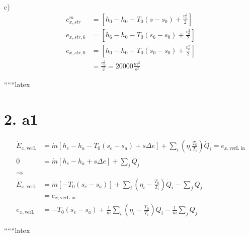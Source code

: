 c)
\begin{align*}
    e_{x,str}^m &= \left[ h_0 - h_0 - T_0 (s - s_0) + \frac{v_0^2}{2} \right] \\
    e_{x,str,6} &= \left[ h_6 - h_0 - T_0 (s_6 - s_0) + \frac{v_6^2}{2} \right] \\
    e_{x,str,0} &= \left[ h_0 - h_0 - T_0 (s_0 - s_0) + \frac{v_0^2}{2} \right] \\
    &= \frac{v_0^2}{2} = 20000 \frac{m^2}{s^2}
\end{align*}

``````latex

\section*{2. a1}

\begin{align*}
    \dot{E}_{x,\text{verL}} &= \dot{m} \left[ h_e - h_a - T_0 (s_e - s_a) + s \Delta e \right] + \sum_i \left( \eta_i \frac{T_0}{T_i} \right) \dot{Q}_i = e_{x,\text{verL in}} \\
    0 &= \dot{m} \left[ h_e - h_a + s \Delta e \right] + \sum_j \dot{Q}_j \\
    \Rightarrow \\
    \dot{E}_{x,\text{verL}} &= \dot{m} \left[ - T_0 (s_e - s_a) \right] + \sum_i \left( \eta_i - \frac{T_0}{T_i} \right) \dot{Q}_i - \sum_j \dot{Q}_j \\
    &= e_{x,\text{verL in}} \\
    e_{x,\text{verL}} &= - T_0 (s_e - s_a) + \frac{1}{\dot{m}} \sum_i \left( \eta_i - \frac{T_0}{T_i} \right) \dot{Q}_i - \frac{1}{\dot{m}} \sum_j \dot{Q}_j
\end{align*}

``````latex